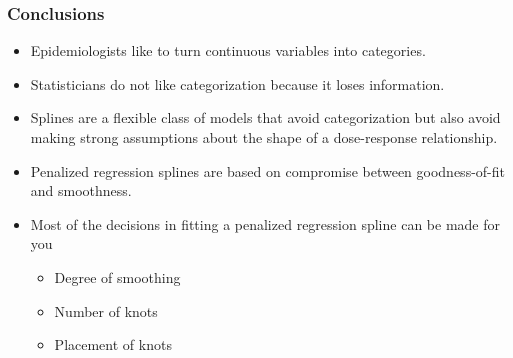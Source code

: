 \documentclass[aspectratio=169]{beamer}
\begin{document}
\begin{frame}
  \frametitle{Conclusions}
  
  \begin{itemize}
  \item Epidemiologists like to turn continuous variables into categories.
  \item Statisticians do not like categorization because it loses information.
  \item Splines are a flexible class of models that avoid categorization
    but also avoid making strong assumptions about the shape of a
    dose-response relationship.
  \item Penalized regression splines are based on compromise between
    goodness-of-fit and smoothness.
  \item Most of the decisions in fitting a penalized regression spline
    can be made for you
    \begin{itemize}
    \item Degree of smoothing
    \item Number of knots
    \item Placement of knots
    \end{itemize}
  \end{itemize}
  
\end{frame}
\end{document}
